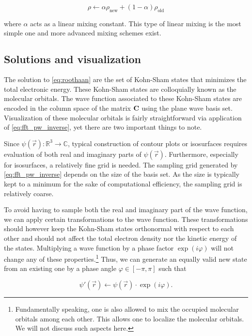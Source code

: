 \begin{equation}
    \rho \leftarrow \alpha \rho_{\text{new}} + (1 - \alpha) \rho_{\text{old}}
\end{equation}

where $\alpha$ acts as a linear mixing constant. This type of linear mixing is the most simple one and more advanced mixing schemes exist.

%
%
%
\subsection{Solutions and visualization}

The solution to \cref{eq:roothaan} are the set of Kohn-Sham states that minimizes the total electronic energy. These Kohn-Sham states are colloquially known as the molecular orbitals. The wave function associated to these Kohn-Sham states are encoded in the column space of the matrix $\mathbf{C}$ using the plane wave basis set. Visualization of these molecular orbitals is fairly straightforward via application of \cref{eq:fft_pw_inverse}, yet there are two important things to note.

Since $\psi(\vec{r}): \mathbb{R}^{3} \rightarrow \mathbb{C}$, typical construction of contour plots or isosurfaces requires evaluation of both real and imaginary parts of $\psi(\vec{r})$. Furthermore, especially for isosurfaces, a relatively fine grid is needed. The sampling grid generated by \cref{eq:fft_pw_inverse} depends on the size of the basis set. As the size is typically kept to a minimum for the sake of computational efficiency, the sampling grid is relatively coarse.

To avoid having to sample both the real and imaginary part of the wave function, we can apply certain transformations to the wave function. These transformations should however keep the Kohn-Sham states orthonormal with respect to each other and should not affect the total electron density nor the kinetic energy of the states. Multiplying a wave function by a phase factor $\exp(i\varphi)$ will not change any of these properties.\footnote{Fundamentally speaking, one is also allowed to mix the occupied molecular orbitals among each other. This allows one to localize the molecular orbitals. We will not discuss such aspects here.} Thus, we can generate an equally valid new state from an existing one by a phase angle $\varphi \in [-\pi,\pi]$ such that

\begin{equation}
    \psi\prime(\vec{r}) \leftarrow \psi(\vec{r}) \cdot \exp \left(i \varphi \right).
    \label{eq:psi_transform}
\end{equation}

